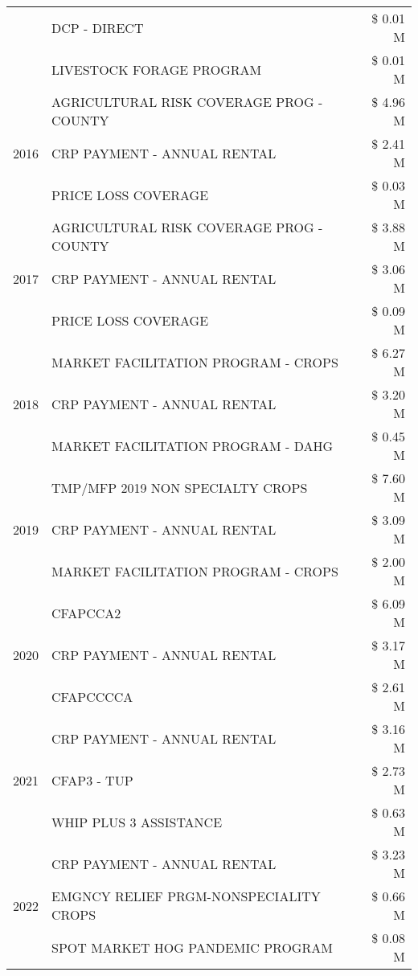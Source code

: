 \begin{tabular}{llr}
 & DCP - DIRECT & \$ 0.01 M \\
 & LIVESTOCK FORAGE PROGRAM & \$ 0.01 M \\
\cline{1-3}
\multirow[t]{3}{*}{2016} & AGRICULTURAL RISK COVERAGE PROG - COUNTY & \$ 4.96 M \\
 & CRP PAYMENT - ANNUAL RENTAL & \$ 2.41 M \\
 & PRICE LOSS COVERAGE & \$ 0.03 M \\
\cline{1-3}
\multirow[t]{3}{*}{2017} & AGRICULTURAL RISK COVERAGE PROG - COUNTY & \$ 3.88 M \\
 & CRP PAYMENT - ANNUAL RENTAL & \$ 3.06 M \\
 & PRICE LOSS COVERAGE & \$ 0.09 M \\
\cline{1-3}
\multirow[t]{3}{*}{2018} & MARKET FACILITATION PROGRAM - CROPS & \$ 6.27 M \\
 & CRP PAYMENT - ANNUAL RENTAL & \$ 3.20 M \\
 & MARKET FACILITATION PROGRAM - DAHG & \$ 0.45 M \\
\cline{1-3}
\multirow[t]{3}{*}{2019} & TMP/MFP 2019 NON SPECIALTY CROPS & \$ 7.60 M \\
 & CRP PAYMENT - ANNUAL RENTAL & \$ 3.09 M \\
 & MARKET FACILITATION PROGRAM - CROPS & \$ 2.00 M \\
\cline{1-3}
\multirow[t]{3}{*}{2020} & CFAPCCA2 & \$ 6.09 M \\
 & CRP PAYMENT - ANNUAL RENTAL & \$ 3.17 M \\
 & CFAPCCCCA & \$ 2.61 M \\
\cline{1-3}
\multirow[t]{3}{*}{2021} & CRP PAYMENT - ANNUAL RENTAL & \$ 3.16 M \\
 & CFAP3 - TUP & \$ 2.73 M \\
 & WHIP PLUS 3 ASSISTANCE & \$ 0.63 M \\
\cline{1-3}
\multirow[t]{3}{*}{2022} & CRP PAYMENT - ANNUAL RENTAL & \$ 3.23 M \\
 & EMGNCY RELIEF PRGM-NONSPECIALITY CROPS & \$ 0.66 M \\
 & SPOT MARKET HOG PANDEMIC PROGRAM & \$ 0.08 M \\
\cline{1-3}
\bottomrule
\end{tabular}

